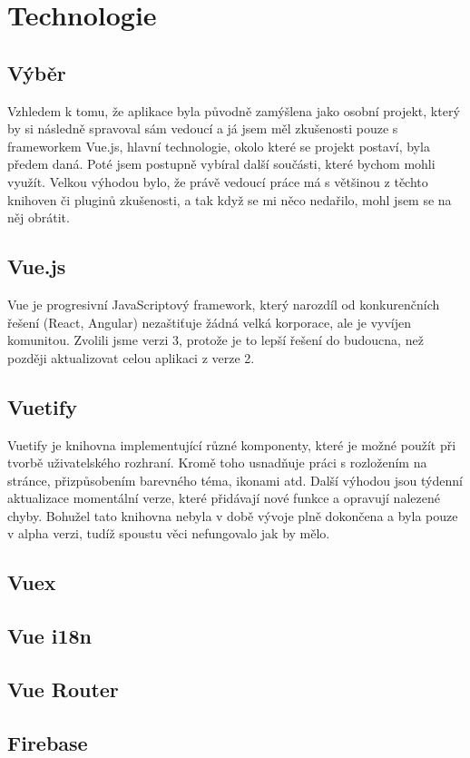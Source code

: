 
\chapter{Technologie}

\section{Výběr}
Vzhledem k tomu, že aplikace byla původně zamýšlena jako osobní projekt, který by si následně spravoval sám vedoucí a já
jsem měl zkušenosti pouze s frameworkem Vue.js, hlavní technologie, okolo které se projekt postaví, byla předem daná. Poté
jsem postupně vybíral další součásti, které bychom mohli využít. Velkou výhodou bylo, že právě vedoucí práce má s většinou
z těchto knihoven či pluginů zkušenosti, a tak když se mi něco nedařilo, mohl jsem se na něj obrátit.

\section{Vue.js}
Vue je progresivní JavaScriptový framework, který narozdíl od konkurenčních řešení (React, Angular) nezaštiťuje žádná velká
korporace, ale je vyvíjen komunitou.\cite{VueJS} Zvolili jsme verzi 3, protože je to lepší řešení do budoucna, než později aktualizovat
celou aplikaci z verze 2. %

\section{Vuetify}
Vuetify je knihovna implementující různé komponenty, které je možné použít při tvorbě uživatelského rozhraní. Kromě toho
usnadňuje práci s rozložením na stránce, přizpůsobením barevného téma, ikonami atd. Další výhodou jsou týdenní aktualizace
momentální verze, které přidávají nové funkce a opravují nalezené chyby.\cite{VuetifyWhy}
Bohužel tato knihovna nebyla v době vývoje plně dokončena a byla pouze v alpha verzi, tudíž spoustu věci nefungovalo jak by mělo.

\section{Vuex}

\section{Vue i18n}

\section{Vue Router}

\section{Firebase}

